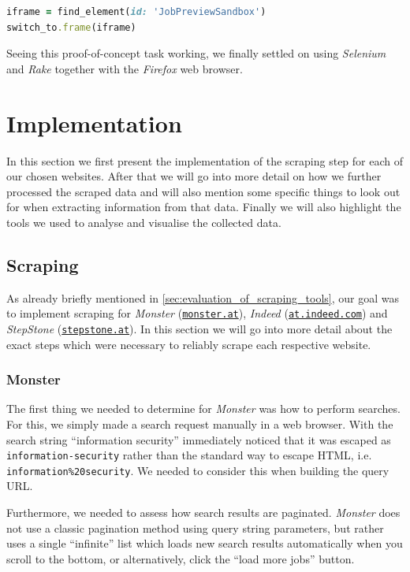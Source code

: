 \documentclass[runningheads]{llncs}
\begin{document}
\begin{lstlisting}[language=Ruby]
iframe = find_element(id: 'JobPreviewSandbox')
switch_to.frame(iframe)
\end{lstlisting}

Seeing this proof-of-concept task working, we finally settled on using \textit{Selenium} and \textit{Rake} together with the \textit{Firefox} web browser.

\section{Implementation}
\label{sec:implementation}

In this section we first present the implementation of the scraping step for each of our chosen websites. After that we will go into more detail on how we further processed the scraped data and will also mention some specific things to look out for when extracting information from that data. Finally we will also highlight the tools we used to analyse and visualise the collected data.

\subsection{Scraping}
\label{sub:scraping}

As already briefly mentioned in \autoref{sec:evaluation_of_scraping_tools}, our goal was to implement scraping for \textit{Monster} (\href{https://www.monster.at/}{\texttt{monster.at}}), \textit{Indeed} (\href{https://at.indeed.com/}{\texttt{at.indeed.com}}) and \textit{StepStone} (\href{https://www.stepstone.at/}{\texttt{stepstone.at}}). In this section we will go into more detail about the exact steps which were necessary to reliably scrape each respective website.

\subsubsection{Monster}
\label{subsub:monster}

The first thing we needed to determine for \textit{Monster} \cite{monster} was how to perform searches. For this, we simply made a search request manually in a web browser. With the search string “information security” immediately noticed that it was escaped as \texttt{information-security} rather than the standard way to escape HTML, i.e. \texttt{information\%20security}. We needed to consider this when building the query URL.

Furthermore, we needed to assess how search results are paginated. \textit{Monster} does not use a classic pagination method using query string parameters, but rather uses a single “infinite” list which loads new search results automatically when you scroll to the bottom, or alternatively, click the “load more jobs” button.
\end{document}
